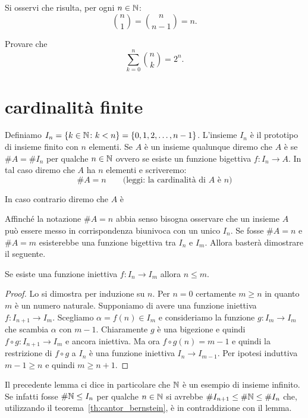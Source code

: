 Si osservi che risulta, per ogni $n\in \mathbb N$:
\[
  {n \choose 1} = {n \choose n-1} = n.
\]
  
\begin{exercise}
  Provare che
  \[
   \sum_{k=0}^n {n \choose k} = 2^n.
  \]
\end{exercise}
  
\section{cardinalità finite}
  
\begin{definition}
  Definiamo $I_n = {\left\{ k\in \mathbb N \colon k<n \right\}} = \{ 0,1, 2, \dots, n-1\}$.
  L'insieme $I_n$ è il prototipo di insieme finito con $n$ elementi.
  Se $A$ è un insieme qualunque diremo che $A$ è  
  se $\#A = \#I_n$ per qualche $n\in \mathbb N$ ovvero se esiste 
  un funzione bigettiva $f\colon I_n \to A$.
  In tal caso diremo che $A$ ha $n$ elementi e scriveremo:
  \[
    \# A = n\qquad\text{(leggi: la cardinalità di $A$ è $n$)}
  \]

  In caso contrario diremo che $A$ è 
\end{definition}

Affinché la notazione $\# A = n$ abbia senso bisogna osservare che un insieme 
$A$ può essere messo in corrispondenza biunivoca con un unico $I_n$. 
Se fosse $\# A = n$ e $\# A = m$ esisterebbe una funzione bigettiva 
tra $I_n$ e $I_m$. Allora basterà dimostrare il seguente.

\begin{lemma}
Se esiste una funzione iniettiva $f\colon I_n \to I_m$ 
allora $n\le m$. 
\end{lemma}
\begin{proof}
  Lo si dimostra per induzione su $n$. 
  Per $n=0$ certamente $m\ge n$ in quanto $m$ è un numero naturale.
  Supponiamo di avere una funzione iniettiva $f\colon I_{n+1}\to I_m$.
  Scegliamo $\alpha = f(n) \in I_m$ e consideriamo la funzione 
  $g\colon I_m\to I_m$ che scambia $\alpha$ con $m-1$.
  Chiaramente $g$ è una bigezione e quindi $f\circ g\colon I_{n+1}\to I_m$ 
  e ancora iniettiva. 
  Ma ora $f\circ g(n)=m-1$ e quindi la restrizione di $f\circ g$ a $I_n$ è una funzione 
  iniettiva $I_n \to I_{m-1}$. Per ipotesi induttiva $m-1\ge n$ e quindi $m\ge n+1$.
\end{proof}

Il precedente lemma ci dice in particolare che $\mathbb N$ è un esempio di insieme infinito.
Se infatti fosse $\#\mathbb N \le I_n$ per qualche $n\in \mathbb N$ si avrebbe
$\# I_{n+1}\le \#\mathbb N \le \#I_n$ che, utilizzando il teorema~\ref{th:cantor_bernstein},
è in contraddizione con il lemma.

